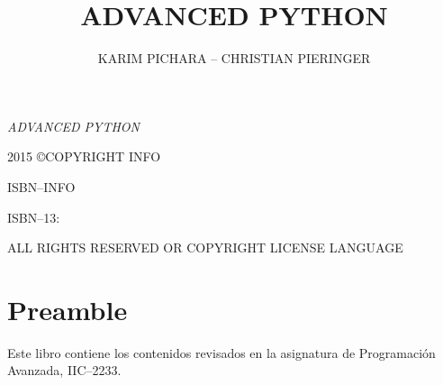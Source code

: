 \documentclass[10pt,twoside,openright]{memoir}
\author{KARIM PICHARA -- CHRISTIAN PIERINGER}
\title{ADVANCED PYTHON}
\date{}
\makeatletter
\def\maketitle{%
  \null
  \thispagestyle{empty}%
  \vfill
  \begin{center}\leavevmode
    \normalfont
    {\large\raggedleft \@author\par}%
    \hrulefill\par
    {\huge\raggedright \@title\par}%
    \vskip 1cm
  \end{center}%
  \vfill
  \null
  \cleardoublepage
  }
\makeatother
\begin{document}
\let\cleardoublepage\clearpage


\maketitle






\frontmatter

\null\vfill

\begin{flushleft}
\textit{ADVANCED PYTHON}


2015 \copyright  COPYRIGHT INFO


ISBN--INFO

ISBN--13:
\bigskip

ALL RIGHTS RESERVED OR COPYRIGHT LICENSE LANGUAGE

\end{flushleft}
\let\cleardoublepage\clearpage

\mainmatter
\sloppy

\section *{Preamble}
Este libro contiene los contenidos revisados en la asignatura de Programación Avanzada, IIC--2233.

\newpage
\tableofcontents


%

%
%
%
%
%
%
%
%
%
%
%



\end{document}
